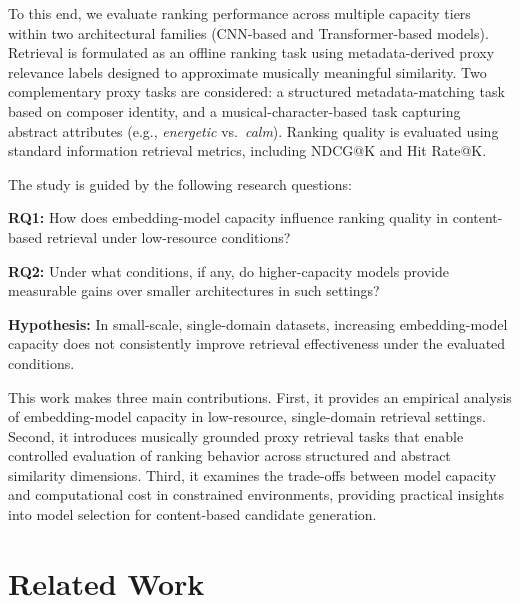 \documentclass[sigconf]{acmart}
\begin{document}
To this end, we evaluate ranking performance across multiple capacity tiers within two architectural families (CNN-based and Transformer-based models). 
Retrieval is formulated as an offline ranking task using metadata-derived proxy relevance labels designed to approximate musically meaningful similarity. Two complementary proxy tasks are considered: a structured metadata-matching task based on composer identity, and a musical-character-based task capturing abstract attributes (e.g., \emph{energetic} vs.\ \emph{calm}). 
Ranking quality is evaluated using standard information retrieval metrics, including NDCG@K and Hit Rate@K.

The study is guided by the following research questions:

\noindent\textbf{RQ1:} How does embedding-model capacity influence ranking quality in content-based retrieval under low-resource conditions?

\noindent\textbf{RQ2:} Under what conditions, if any, do higher-capacity models provide measurable gains over smaller architectures in such settings?

\noindent\textbf{Hypothesis:} In small-scale, single-domain datasets, increasing embedding-model capacity does not consistently improve retrieval effectiveness under the evaluated conditions.

This work makes three main contributions. First, it provides an empirical analysis of embedding-model capacity in low-resource, single-domain retrieval settings. Second, it introduces musically grounded proxy retrieval tasks that enable controlled evaluation of ranking behavior across structured and abstract similarity dimensions. Third, it examines the trade-offs between model capacity and computational cost in constrained environments, providing practical insights into model selection for content-based candidate generation.


\section{Related Work}\label{sec:related-work}
\end{document}
